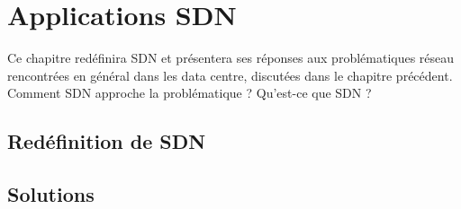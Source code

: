 
\chapter{Applications SDN}

Ce chapitre redéfinira SDN et présentera ses réponses aux problématiques réseau rencontrées en général dans les data centre, discutées dans le chapitre précédent. Comment SDN approche la problématique ? Qu'est-ce que SDN ?

\section{Redéfinition de SDN}

\section{Solutions}